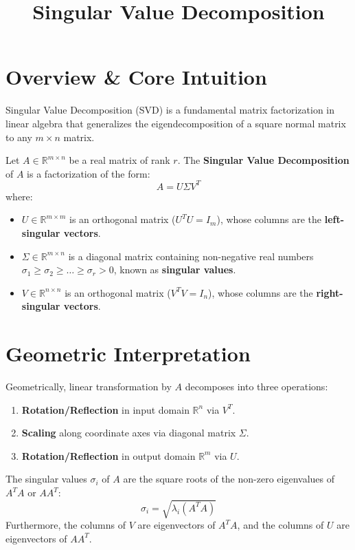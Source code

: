 \documentclass[mode=handout, palette=nord, fontsize=11pt]{modernclassnotes}
\title{Singular Value Decomposition}
\begin{document}
\maketitle

\section{Overview \& Core Intuition}

Singular Value Decomposition (SVD) is a fundamental matrix factorization in linear algebra that generalizes the eigendecomposition of a square normal matrix to any $m \times n$ matrix.

\begin{definition}
Let $A \in \mathbb{R}^{m \times n}$ be a real matrix of rank $r$. The \textbf{Singular Value Decomposition} of $A$ is a factorization of the form:
\[
A = U \Sigma V^T
\]
where:
\begin{itemize}
    \item $U \in \mathbb{R}^{m \times m}$ is an orthogonal matrix ($U^T U = I_m$), whose columns are the \textbf{left-singular vectors}.
    \item $\Sigma \in \mathbb{R}^{m \times n}$ is a diagonal matrix containing non-negative real numbers $\sigma_1 \ge \sigma_2 \ge \dots \ge \sigma_r > 0$, known as \textbf{singular values}.
    \item $V \in \mathbb{R}^{n \times n}$ is an orthogonal matrix ($V^T V = I_n$), whose columns are the \textbf{right-singular vectors}.
\end{itemize}
\end{definition}

\section{Geometric Interpretation}

Geometrically, linear transformation by $A$ decomposes into three operations:
\begin{enumerate}
    \item \textbf{Rotation/Reflection} in input domain $\mathbb{R}^n$ via $V^T$.
    \item \textbf{Scaling} along coordinate axes via diagonal matrix $\Sigma$.
    \item \textbf{Rotation/Reflection} in output domain $\mathbb{R}^m$ via $U$.
\end{enumerate}

\begin{theorem}
The singular values $\sigma_i$ of $A$ are the square roots of the non-zero eigenvalues of $A^T A$ or $A A^T$:
\[
\sigma_i = \sqrt{\lambda_i(A^T A)}
\]
Furthermore, the columns of $V$ are eigenvectors of $A^T A$, and the columns of $U$ are eigenvectors of $A A^T$.
\end{theorem}
\end{document}

